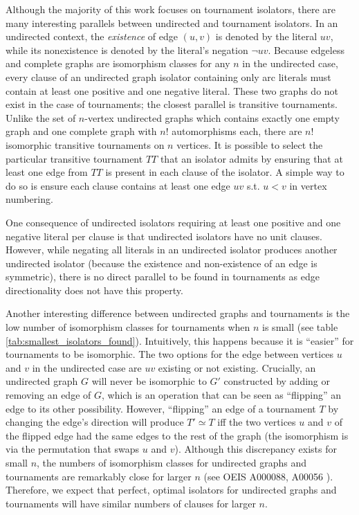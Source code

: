 \documentclass[conference]{IEEEtran}
\begin{document}
Although the majority of this work focuses on tournament isolators, there are many interesting parallels between undirected and tournament isolators. In an undirected context, the \emph{existence} of edge $(u,v)$ is denoted by the literal $uv$, while its nonexistence is denoted by the literal's negation $\lnot uv$.
Because edgeless and complete graphs are isomorphism classes for any $n$ in the undirected case, every clause of an undirected graph isolator containing only arc literals must contain at least one positive and one negative literal. These two graphs do not exist in the case of tournaments; the closest parallel is transitive tournaments. Unlike the set of $n$-vertex undirected graphs which contains exactly one empty graph and one complete graph with $n!$ automorphisms each, there are $n!$ isomorphic transitive tournaments on $n$ vertices. It is possible to select the particular transitive tournament $TT$ that an isolator admits by ensuring that at least one edge from $TT$ is present in each clause of the isolator. A simple way to do so is ensure each clause contains at least one edge $uv$ s.t. $u<v$ in vertex numbering. 

One consequence of undirected isolators requiring at least one positive and one negative literal per clause is that undirected isolators have no unit clauses. However, while negating all literals in an undirected isolator produces another undirected isolator (because the existence and non-existence of an edge is symmetric), there is no direct parallel to be found in tournaments as edge directionality does not have this property.

Another interesting difference between undirected graphs and tournaments is the low number of isomorphism classes for tournaments when $n$ is small (see table \ref{tab:smallest_isolators_found}). Intuitively, this happens because it is ``easier'' for tournaments to be isomorphic. The two options for the edge between vertices $u$ and $v$ in the undirected case are $uv$ existing or not existing. Crucially, an undirected graph $G$ will never be isomorphic to $G'$ constructed by adding or removing an edge of $G$, which is an operation that can be seen as ``flipping'' an edge to its other possibility. However, ``flipping'' an edge of a tournament $T$ by changing the edge's direction will produce $T' \simeq T$ iff the two vertices $u$ and $v$ of the flipped edge had the same edges to the rest of the graph (the isomorphism is via the permutation that swaps $u$ and $v$). Although this discrepancy exists for small $n$, the numbers of isomorphism classes for undirected graphs and tournaments are remarkably close for larger $n$ (see OEIS A000088, A00056 \cite{ref_oeis}). Therefore, we expect that perfect, optimal isolators for undirected graphs and tournaments will have similar numbers of clauses for larger $n$.
\end{document}
